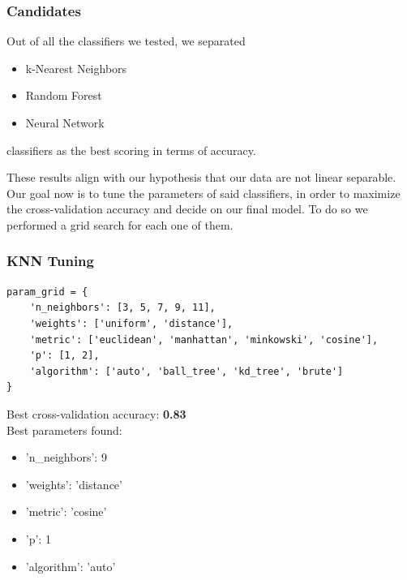 \documentclass{beamer}
\begin{document}
\begin{frame}
\frametitle{Candidates}
Out of all the classifiers we tested, we separated
\begin{itemize}
    \item k-Nearest Neighbors
    \item Random Forest 
    \item Neural Network
\end{itemize} 
classifiers as the best scoring in terms of accuracy. \vspace{0.5cm}

These results align with our hypothesis that our data are not linear separable. Our goal now is to tune the parameters of said classifiers, in order to maximize the cross-validation accuracy and decide on our final model. To do so we performed a grid search for each one of them.
\end{frame}

\begin{frame}[fragile]
\frametitle{KNN Tuning}
\lstset{style=PythonStyle}
\begin{lstlisting}
param_grid = {
    'n_neighbors': [3, 5, 7, 9, 11],
    'weights': ['uniform', 'distance'],
    'metric': ['euclidean', 'manhattan', 'minkowski', 'cosine'],
    'p': [1, 2],
    'algorithm': ['auto', 'ball_tree', 'kd_tree', 'brute']
}
\end{lstlisting}
Best cross-validation accuracy: \textbf{0.83} \\
Best parameters found: 
\begin{itemize}
    \item 'n\_neighbors': 9
    \item 'weights': 'distance'
    \item 'metric': 'cosine'
    \item 'p': 1
    \item 'algorithm': 'auto'
\end{itemize}
\end{frame}
\end{document}
